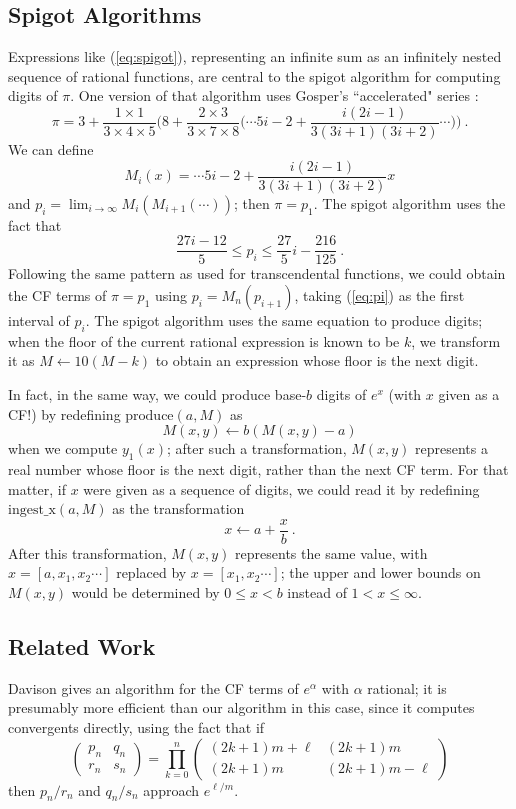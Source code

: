 \documentclass[11pt, oneside]{amsart}   	%
\renewcommand{\:}{\negthickspace:\negthickspace}
\begin{document}
\subsection{Spigot Algorithms}\label{sec:spigot}
Expressions like (\ref{eq:spigot}), representing an infinite sum as an infinitely nested sequence of rational functions, are central to the spigot algorithm\cite{Gibbons2016,Rabinowitz2016} for computing digits of $\pi$. One version of that algorithm uses Gosper's ``accelerated" series \cite{acceleration}:
\[
\pi = 3 + \frac{1 \times 1}{3 \times 4 \times 5}\big(8 + \frac{2 \times 3}{3 \times 7 \times 8}\big( \cdots 5i-2 + \frac{i(2i-1)}{3(3i+1)(3i+2)} \cdots \big) \big) \ .
\]
We can define
\[
M_i(x) = \cdots 5i-2 + \frac{i(2i-1)}{3(3i+1)(3i+2)}x
\]
and $p_i = \lim_{i \to \infty} M_i(M_{i+1}(\cdots))$;
then $\pi = p_1$. The spigot algorithm uses the fact that
\begin{equation}\label{eq:pi}
\frac{27i-12}{5} \leq p_i \leq \frac{27}{5}i - \frac{216}{125} \ .
\end{equation}
Following the same pattern as used for transcendental functions, we could obtain the CF terms of $\pi = p_1$ using $p_i = M_n(p_{i+1})$, taking (\ref{eq:pi}) as the first interval of $p_i$. The spigot algorithm uses the same equation to produce digits; when the floor of the current rational expression is known to be $k$, we transform it as $M \leftarrow 10(M-k)$ to obtain an expression whose floor is the next digit.

In fact, in the same way, we could produce base-$b$ digits of $e^x$ (with $x$ given as a CF!) by redefining $\mbox{produce}(a, M)$ as
\[
M(x,y) \leftarrow b(M(x,y) - a)
\]
when we compute $y_1(x)$;
after such a transformation, $M(x,y)$ represents a real number whose floor is the next digit, rather than the next CF term. 
For that matter, if $x$ were given as a sequence of digits, we could read it by redefining $\mbox{ingest\_x}(a,M)$ as the transformation
\[
x \leftarrow a + \frac{x}{b} \ .
\]
 After this transformation, $M(x,y)$ represents the same value, with $x=[a,x_1,x_2\cdots]$ replaced by $x=[x_1,x_2\cdots]$; the upper and lower bounds on $M(x,y)$ would be determined by $0 \leq x < b$ instead of $1 <  x \leq \infty$.


\subsection{Related Work}
Davison \cite{DavisonCFexp} gives an algorithm for the CF terms of $e^{\alpha}$ with $\alpha$ rational;
it is presumably more efficient than our algorithm in this case, since it computes convergents directly, using the fact that if
\[
\begin{pmatrix}
p_n & q_n \\
r_n & s_n \end{pmatrix} = \prod_{k=0}^n \begin{pmatrix} (2k+1)m+\ell & (2k+1)m \\
                                                       (2k+1)m &  (2k+1)m-\ell \end{pmatrix}
\]
then $p_n/r_n$ and $q_n/s_n$ approach $e^{\ell/m}$.
\end{document}
